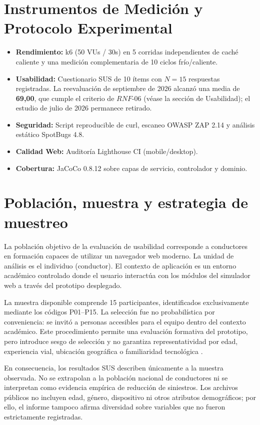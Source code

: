 \documentclass[11pt,a4paper]{report}
\begin{document}
\section{Instrumentos de Medición y Protocolo Experimental}
\begin{itemize}
    \item \textbf{Rendimiento:} k6 (50 VUs / 30s) en 5 corridas independientes de caché caliente y una medición complementaria de 10 ciclos frío/caliente.
    \item \textbf{Usabilidad:} Cuestionario SUS de 10 ítems \cite{brooke1996sus} con $N = 15$ respuestas registradas. La reevaluación de septiembre de 2026 alcanzó una media de \textbf{69,00}, que cumple el criterio de $RNF\text{-}06$ (véase la sección de Usabilidad); el estudio de julio de 2026 permanece retirado.
    \item \textbf{Seguridad:} Script reproducible de curl, escaneo OWASP ZAP 2.14 y análisis estático SpotBugs 4.8.
    \item \textbf{Calidad Web:} Auditoría Lighthouse CI (mobile/desktop).
    \item \textbf{Cobertura:} JaCoCo 0.8.12 sobre capas de servicio, controlador y dominio.
\end{itemize}

\section{Población, muestra y estrategia de muestreo}
La población objetivo de la evaluación de usabilidad corresponde a conductores en formación capaces de utilizar un navegador web moderno. La unidad de análisis es el individuo (conductor). El contexto de aplicación es un entorno académico controlado donde el usuario interactúa con los módulos del simulador web a través del prototipo desplegado.

La muestra disponible comprende 15 participantes, identificados exclusivamente mediante los códigos P01--P15. La selección fue no probabilística por conveniencia: se invitó a personas accesibles para el equipo dentro del contexto académico. Este procedimiento permite una evaluación formativa del prototipo, pero introduce sesgo de selección y no garantiza representatividad por edad, experiencia vial, ubicación geográfica o familiaridad tecnológica \cite{baltes2022sampling}.

En consecuencia, los resultados SUS describen únicamente a la muestra observada. No se extrapolan a la población nacional de conductores ni se interpretan como evidencia empírica de reducción de siniestros. Los archivos públicos no incluyen edad, género, dispositivo ni otros atributos demográficos; por ello, el informe tampoco afirma diversidad sobre variables que no fueron estrictamente registradas.
\end{document}
